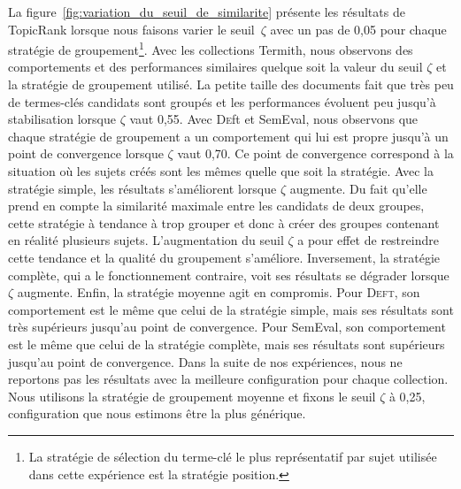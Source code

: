         La figure~\ref{fig:variation_du_seuil_de_similarite} présente les
        résultats de TopicRank lorsque nous faisons varier le seuil~$\zeta$ avec
        un pas de 0,05 pour chaque stratégie de groupement\footnote{La
        stratégie de sélection du terme-clé le plus représentatif par sujet
        utilisée dans cette expérience est la stratégie position.}.
        Avec les collections Termith, nous observons des comportements et des
        performances similaires quelque soit la valeur du seuil $\zeta$ et la
        stratégie de groupement utilisé. La petite taille des documents fait que
        très peu de termes-clés candidats sont groupés et les performances
        évoluent peu jusqu'à stabilisation lorsque $\zeta$ vaut 0,55. Avec \textsc{De}ft et
        SemEval, nous observons que chaque stratégie de groupement a un
        comportement qui lui est propre jusqu'à un point de convergence lorsque
        $\zeta$ vaut 0,70. Ce point de
        convergence correspond à la situation où les sujets créés sont les mêmes
        quelle que soit la stratégie. Avec la stratégie simple, les résultats
        s'améliorent lorsque $\zeta$ augmente. Du fait qu'elle prend en compte
        la similarité maximale entre les candidats de deux groupes, cette
        stratégie à tendance à trop grouper et donc à créer des groupes
        contenant en réalité plusieurs sujets. L'augmentation du seuil $\zeta$ a
        pour effet de restreindre cette tendance et la qualité du groupement
        s'améliore. Inversement, la stratégie complète, qui a le fonctionnement
        contraire, voit ses résultats se dégrader lorsque $\zeta$ augmente.
        Enfin, la stratégie moyenne agit en compromis. Pour \textsc{Deft}, son
        comportement est le même que celui de la stratégie simple, mais ses
        résultats sont très supérieurs jusqu'au point de convergence. Pour
        SemEval, son comportement est le même que celui de la stratégie
        complète, mais ses résultats sont supérieurs jusqu'au point de
        convergence.
        Dans la suite de nos expériences, nous ne reportons pas les résultats
        avec la meilleure configuration pour chaque collection. Nous utilisons
        la stratégie de groupement moyenne et fixons le seuil $\zeta$ à 0,25,
        configuration que nous estimons être la plus générique.

